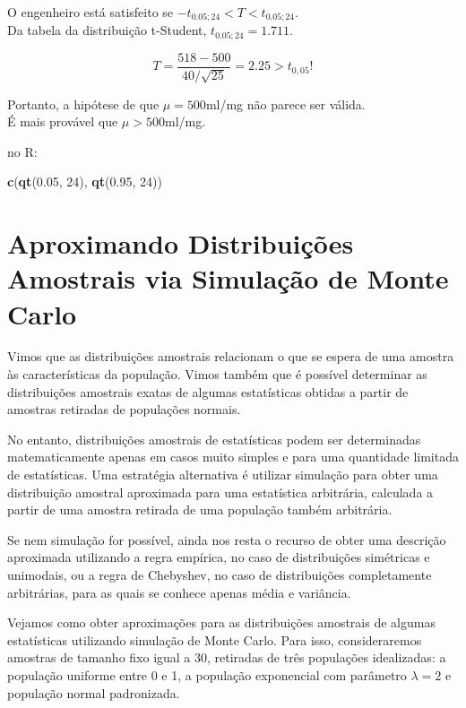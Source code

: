 \documentclass[
]{book}
\newenvironment{Shaded}{\begin{snugshade}}{\end{snugshade}}
\newcommand{\DecValTok}[1]{\textcolor[rgb]{0.00,0.00,0.81}{#1}}
\newcommand{\FloatTok}[1]{\textcolor[rgb]{0.00,0.00,0.81}{#1}}
\newcommand{\KeywordTok}[1]{\textcolor[rgb]{0.13,0.29,0.53}{\textbf{#1}}}
\newcommand{\NormalTok}[1]{#1}
\theoremstyle{definition}
\theoremstyle{definition}
\theoremstyle{definition}
\theoremstyle{remark}
\begin{document}
O engenheiro está satisfeito se \(-t_{0.05; 24} < T < t_{0.05; 24}\).\\
Da tabela da distribuição t-Student, \(t_{0.05; 24} = 1.711\).

\[T = \frac{518 - 500}{40/\sqrt{25}} = 2.25 > t_{0,05}!\]

Portanto, a hipótese de que \(\mu=500\)ml/mg não parece ser válida.\\
É mais provável que \(\mu>500\)ml/mg.

no R:

\begin{Shaded}
\begin{Highlighting}[]
\KeywordTok{c}\NormalTok{(}\KeywordTok{qt}\NormalTok{(}\FloatTok{0.05}\NormalTok{, }\DecValTok{24}\NormalTok{), }\KeywordTok{qt}\NormalTok{(}\FloatTok{0.95}\NormalTok{, }\DecValTok{24}\NormalTok{))}
\end{Highlighting}
\end{Shaded}

\hypertarget{aproximando-distribuiuxe7uxf5es-amostrais-via-simulauxe7uxe3o-de-monte-carlo}{%
\section{Aproximando Distribuições Amostrais via Simulação de Monte Carlo}\label{aproximando-distribuiuxe7uxf5es-amostrais-via-simulauxe7uxe3o-de-monte-carlo}}

Vimos que as distribuições amostrais relacionam o que se espera de uma amostra às características da população. Vimos também que é possível determinar as distribuições amostrais exatas de algumas estatísticas obtidas a partir de amostras retiradas de populações normais.

No entanto, distribuições amostrais de estatísticas podem ser determinadas matematicamente apenas em casos muito simples e para uma quantidade limitada de estatísticas. Uma estratégia alternativa é utilizar simulação para obter uma distribuição amostral aproximada para uma estatística arbitrária, calculada a partir de uma amostra retirada de uma população também arbitrária.

Se nem simulação for possível, ainda nos resta o recurso de obter uma descrição aproximada utilizando a regra empírica, no caso de distribuições simétricas e unimodais, ou a regra de Chebyshev, no caso de distribuições completamente arbitrárias, para as quais se conhece apenas média e variância.

Vejamos como obter aproximações para as distribuições amostrais de algumas estatísticas utilizando simulação de Monte Carlo. Para isso, consideraremos amostras de tamanho fixo igual a 30, retiradas de três populações idealizadas: a população uniforme entre 0 e 1, a população exponencial com parâmetro \(\lambda = 2\) e população normal padronizada.
\end{document}
